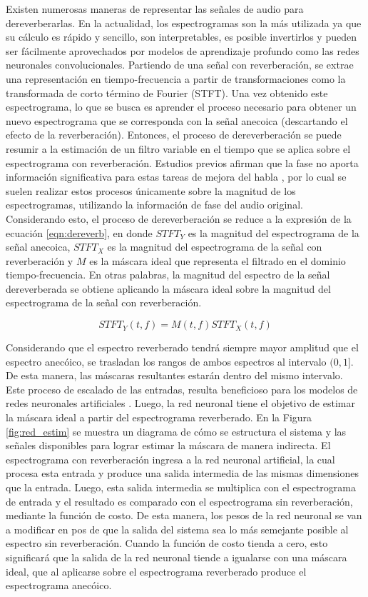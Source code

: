 Existen numerosas maneras de representar las señales de audio para dereverberarlas. En la actualidad, los espectrogramas son la más utilizada ya que su cálculo es rápido y sencillo, son interpretables, es posible invertirlos y pueden ser fácilmente aprovechados por modelos de aprendizaje profundo como las redes neuronales convolucionales. Partiendo de una señal con reverberación, se extrae una representación en tiempo-frecuencia a partir de transformaciones como la transformada de corto término de Fourier (STFT). Una vez obtenido este espectrograma, lo que se busca es aprender el proceso necesario para obtener un nuevo espectrograma que se corresponda con la señal anecoica (descartando el efecto de la reverberación). Entonces, el proceso de dereverberación se puede resumir a la estimación de un filtro variable en el tiempo que se aplica sobre el espectrograma con reverberación. Estudios previos afirman que la fase no aporta información significativa para estas tareas de mejora del habla \cite{fase1}\cite{fase2}, por lo cual se suelen realizar estos procesos únicamente sobre la magnitud de los espectrogramas, utilizando la información de fase del audio original. Considerando esto, el proceso de dereverberación se reduce a la expresión de la ecuación \ref{eqn:dereverb}, en donde $STFT_{Y}$ es la magnitud del espectrograma de la señal anecoica, $STFT_{X}$ es la magnitud del espectrograma de la señal con reverberación y $M$ es la máscara ideal que representa el filtrado en el dominio tiempo-frecuencia. En otras palabras, la magnitud del espectro de la señal dereverberada se obtiene aplicando la máscara ideal sobre la magnitud del espectrograma de la señal con reverberación. 
 
\begin{equation}
\label{eqn:dereverb}
	STFT_{Y}(t,f)= M(t,f) STFT_{X}(t,f) 
\end{equation}

Considerando que el espectro reverberado tendrá siempre mayor amplitud que el espectro anecóico, se trasladan los rangos de ambos espectros al intervalo $(0, 1]$. De esta manera, las máscaras resultantes estarán dentro del mismo intervalo. Este proceso de escalado de las entradas, resulta beneficioso para los modelos de redes neuronales artificiales \cite{lagartija}. Luego, la red neuronal tiene el objetivo de estimar la máscara ideal a partir del espectrograma reverberado. En la Figura \ref{fig:red_estim} se muestra un diagrama de cómo se estructura el sistema y las señales disponibles para lograr estimar la máscara de manera indirecta. El espectrograma con reverberación ingresa a la red neuronal artificial, la cual procesa esta entrada y produce una salida intermedia de las mismas dimensiones que la entrada. Luego, esta salida intermedia se multiplica con el espectrograma de entrada y el resultado es comparado con el espectrograma sin reverberación, mediante la función de costo. De esta manera, los pesos de la red neuronal se van a modificar en pos de que la salida del sistema sea lo más semejante posible al espectro sin reverberación. Cuando la función de costo tienda a cero, esto significará que la salida de la red neuronal tiende a igualarse con una máscara ideal, que al aplicarse sobre el espectrograma reverberado produce el espectrograma anecóico. 

